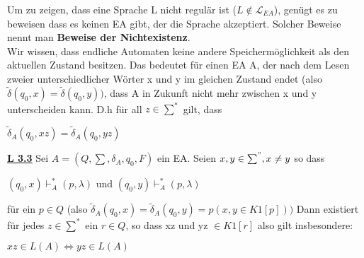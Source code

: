 \documentclass[8pt]{extreport}
\begin{document}
Um zu zeigen, dass eine Sprache L nicht regulär ist ($L \notin \mathcal{L}_{EA}$), genügt es zu beweisen dass es keinen EA gibt, der die Sprache akzeptiert. Solcher Beweise nennt man \textbf{Beweise der Nichtexistenz}.\\
Wir wissen, dass endliche Automaten keine andere Speichermöglichkeit als den aktuellen Zustand besitzen. Das bedeutet für einen EA A, der nach dem Lesen zweier unterschiedlicher Wörter x und y im gleichen Zustand endet (also $\tilde{\delta}(q_0,x) =\tilde{\delta}(q_0,y)) $, dass A in Zukunft nicht mehr zwischen x und y unterscheiden kann. D.h für all $z \in \sum^*$ gilt, dass
\begin{center}
$\tilde{\delta}_A(q_0,xz) = \tilde{\delta}_A(q_0,yz)$
\end{center}

\underline{\textbf{L 3.3}} Sei $A=(Q,\sum,\delta_A,q_0,F)$ ein EA. Seien $x,y \in \sum^", x \neq y$ so dass 
\begin{center}
$(q_0,x) \vdash_A^* (p, \lambda)$ und $(q_0,y) \vdash_A^* (p, \lambda)$
\end{center}
für ein $p \in Q$ (also $\tilde{\delta}_A(q_0,x) = \tilde{\delta}_A(q_0,y) = p (x,y \in K1[p]))$ Dann existiert für jedes $z \in \sum^*$ ein $r \in Q$, so dass xz und yz $\in K1[r]$ also gilt insbesondere:
\begin{center}
$xz \in L(A) \iff yz \in L(A)$
\end{center}
\end{document}
